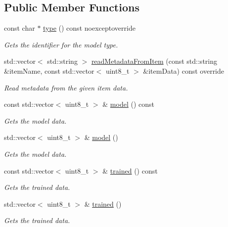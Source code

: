 \subsection*{Public Member Functions}
\begin{DoxyCompactItemize}
\item 
const char $\ast$ \hyperlink{classdg_1_1deepcore_1_1classification_1_1_caffe_model_package_afd5cc8bebbcfc379cfb7c5cc828aa0e0}{type} () const noexceptoverride
\begin{DoxyCompactList}\small\item\em Gets the identifier for the model type. \end{DoxyCompactList}\item 
std\+::vector$<$ std\+::string $>$ \hyperlink{classdg_1_1deepcore_1_1classification_1_1_caffe_model_package_a8013f0d5b4efb54e85e9fe75c1d30d20}{read\+Metadata\+From\+Item} (const std\+::string \&item\+Name, const std\+::vector$<$ uint8\+\_\+t $>$ \&item\+Data) const override
\begin{DoxyCompactList}\small\item\em Read metadata from the given item data. \end{DoxyCompactList}\item 
const std\+::vector$<$ uint8\+\_\+t $>$ \& \hyperlink{group___classification_module_gaa62fc3b5391b279e26f1ef7140f51217}{model} () const 
\begin{DoxyCompactList}\small\item\em Gets the model data. \end{DoxyCompactList}\item 
std\+::vector$<$ uint8\+\_\+t $>$ \& \hyperlink{group___classification_module_gadaf4382bc554e534107ba578956b9431}{model} ()
\begin{DoxyCompactList}\small\item\em Gets the model data. \end{DoxyCompactList}\item 
const std\+::vector$<$ uint8\+\_\+t $>$ \& \hyperlink{group___classification_module_gabd25f1f8b96431128dbd5e1f2dbd6e51}{trained} () const 
\begin{DoxyCompactList}\small\item\em Gets the trained data. \end{DoxyCompactList}\item 
std\+::vector$<$ uint8\+\_\+t $>$ \& \hyperlink{group___classification_module_gab25e04015819d180c69e52aed3992855}{trained} ()
\begin{DoxyCompactList}\small\item\em Gets the trained data. \end{DoxyCompactList}\item 

\end{DoxyCompactItemize}
